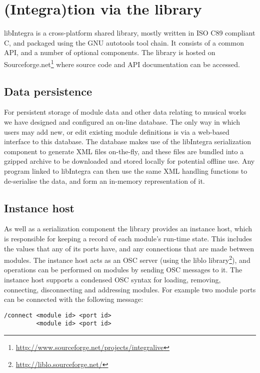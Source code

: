 {\section{(Integra)tion via the library}\label{subsec:db_lib}

libIntegra is a cross-platform shared library, mostly written in ISO C89 compliant C, and packaged using the GNU autotools tool chain. It consists of a common API, and a number of optional components. The library is hosted on Sourceforge.net\footnote{\url{http://www.sourceforge.net/projects/integralive}} where source code and API documentation can be accessed.

\subsection{Data persistence}\label{subsec:serialization}

For persistent storage of module data and other data relating to musical works we have designed and configured an on-line database. The only way in which users may add new, or edit existing module definitions is via a web-based interface to this database. The database makes use of the libIntegra serialization component to generate XML files on-the-fly, and these files are bundled into a gzipped archive to be downloaded and stored locally for potential offline use. Any program linked to libIntegra can then use the same XML handling functions to de-serialise the data, and form an in-memory representation of it.

\subsection{Instance host}\label{subsec:instance_host}

As well as a serialization component the library provides an instance
host, which is responsible for keeping a record of each module's
run-time state. This includes the values that any of its ports have,
and any connections that are made between modules. The instance host
acts as an OSC server (using the liblo
library\footnote{\url{http://liblo.sourceforge.net/}}), and operations
can be performed on modules by sending OSC messages to it. The
instance host supports a condensed OSC syntax for loading, removing,
connecting, disconnecting and addressing modules. For example two
module ports can be connected with the following message: 
\begin{verbatim}
/connect <module id> <port id> 
         <module id> <port id>
\end{verbatim}

}
